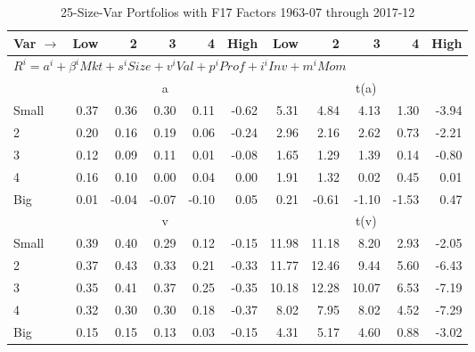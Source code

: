
\begin{table}[!ht]
\footnotesize
\centering
\caption{25-Size-Var Portfolios with F17 Factors 1963-07 through 2017-12}
\begin{tabular}{lrrrrrrrrrr}
  \toprule
    Var $\rightarrow$ & Low & 2 & 3 & 4 & High & Low & 2 & 3 & 4 & High \\ 
  \midrule
  \multicolumn{11}{l}{$R^i=a^i+\beta^iMkt+s^iSize+v^iVal+p^iProf+i^iInv+m^iMom$} \\

  
    
      & \multicolumn{5}{c}{a} & \multicolumn{5}{c}{t(a)}
    
    \\
      \cmidrule(r){2-6} \cmidrule(r){7-11}

    Small   & 0.37  & 0.36  & 0.30  & 0.11  & -0.62  & 5.31  & 4.84  & 4.13  & 1.30  & -3.94  \\
         2  & 0.20  & 0.16  & 0.19  & 0.06  & -0.24  & 2.96  & 2.16  & 2.62  & 0.73  & -2.21  \\
         3  & 0.12  & 0.09  & 0.11  & 0.01  & -0.08  & 1.65  & 1.29  & 1.39  & 0.14  & -0.80  \\
         4  & 0.16  & 0.10  & 0.00  & 0.04  & 0.00  & 1.91  & 1.32  & 0.02  & 0.45  & 0.01  \\
    Big     & 0.01  & -0.04  & -0.07  & -0.10  & 0.05  & 0.21  & -0.61  & -1.10  & -1.53  & 0.47  \\

  
    
      & \multicolumn{5}{c}{v} & \multicolumn{5}{c}{t(v)}
    
    \\
      \cmidrule(r){2-6} \cmidrule(r){7-11}

    Small   & 0.39  & 0.40  & 0.29  & 0.12  & -0.15  & 11.98  & 11.18  & 8.20  & 2.93  & -2.05  \\
         2  & 0.37  & 0.43  & 0.33  & 0.21  & -0.33  & 11.77  & 12.46  & 9.44  & 5.60  & -6.43  \\
         3  & 0.35  & 0.41  & 0.37  & 0.25  & -0.35  & 10.18  & 12.28  & 10.07  & 6.53  & -7.19  \\
         4  & 0.32  & 0.30  & 0.30  & 0.18  & -0.37  & 8.02  & 7.95  & 8.02  & 4.52  & -7.29  \\
    Big     & 0.15  & 0.15  & 0.13  & 0.03  & -0.15  & 4.31  & 5.17  & 4.60  & 0.88  & -3.02  \\

  
    

\end{tabular}
\end{table}
